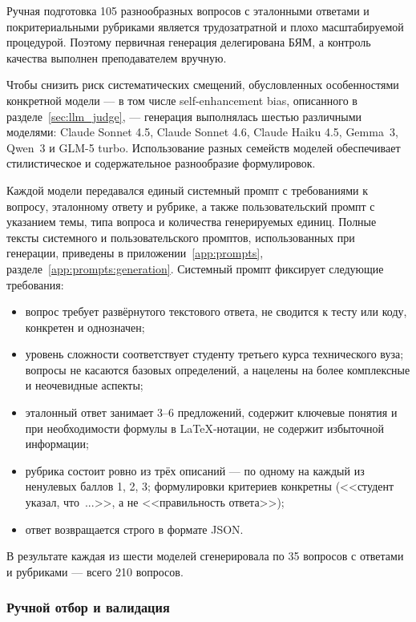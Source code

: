 Ручная подготовка 105 разнообразных вопросов с эталонными ответами и
покритериальными рубриками является трудозатратной и плохо масштабируемой
процедурой. Поэтому первичная генерация делегирована БЯМ, а контроль качества
выполнен преподавателем вручную.

Чтобы снизить риск систематических смещений, обусловленных особенностями
конкретной модели --- в том числе self-enhancement bias, описанного в
разделе~\ref{sec:llm_judge}, --- генерация выполнялась шестью различными
моделями: Claude Sonnet 4.5, Claude Sonnet 4.6, Claude Haiku 4.5, Gemma~3,
Qwen~3 и GLM-5 turbo. Использование разных семейств моделей обеспечивает
стилистическое и содержательное разнообразие формулировок.

Каждой модели передавался единый системный промпт с требованиями к вопросу,
эталонному ответу и рубрике, а также пользовательский промпт с указанием
темы, типа вопроса и количества генерируемых единиц. Полные тексты системного и пользовательского промптов, использованных
при генерации, приведены в приложении~\ref{app:prompts}, разделе~\ref{app:prompts:generation}.
Системный промпт фиксирует следующие требования:

\begin{itemize}
    \item вопрос требует развёрнутого текстового ответа, не сводится к тесту
    или коду, конкретен и однозначен;
    \item уровень сложности соответствует студенту третьего курса
    технического вуза; вопросы не касаются базовых определений, а нацелены
    на более комплексные и неочевидные аспекты;
    \item эталонный ответ занимает 3--6 предложений, содержит ключевые
    понятия и при необходимости формулы в LaTeX-нотации, не содержит
    избыточной информации;
    \item рубрика состоит ровно из трёх описаний --- по одному на каждый
    из ненулевых баллов 1, 2, 3; формулировки критериев конкретны
    (<<студент указал, что~...>>, а не <<правильность ответа>>);
    \item ответ возвращается строго в формате JSON.
\end{itemize}

В результате каждая из шести моделей сгенерировала по 35 вопросов
с ответами и рубриками --- всего 210 вопросов.

\subsubsection{Ручной отбор и валидация}

